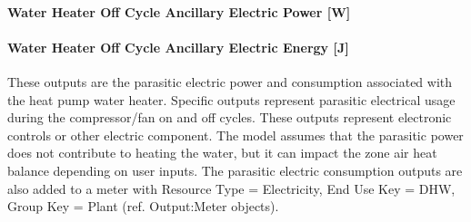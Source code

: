 \paragraph{Water Heater Off Cycle Ancillary Electric Power {[}W{]}}\label{water-heater-off-cycle-ancillary-electric-power-w-1}

\paragraph{Water Heater Off Cycle Ancillary Electric Energy {[}J{]}}\label{water-heater-off-cycle-ancillary-electric-energy-j-1}

These outputs are the parasitic electric power and consumption associated with the heat pump water heater. Specific outputs represent parasitic electrical usage during the compressor/fan on and off cycles. These outputs represent electronic controls or other electric component. The model assumes that the parasitic power does not contribute to heating the water, but it can impact the zone air heat balance depending on user inputs. The parasitic electric consumption outputs are also added to a meter with Resource Type = Electricity, End Use Key = DHW, Group Key = Plant (ref. Output:Meter objects).

